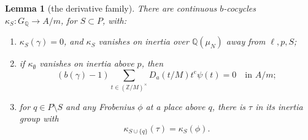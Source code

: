 \documentclass[11pt,a4paper]{article}
\newtheorem{lemma}[theorem]{Lemma}
\theoremstyle{definition}
\newcommand{\Q}{\mathbb Q}
\newcommand{\Z}{\mathbb Z}
\begin{document}
\begin{lemma}[the derivative family]\label{lem:derivative-family}
There are continuous \(b\)-cocycles
\(\kappa_S:G_\Q\to A/m\), for \(S\subset P\), with:
\begin{enumerate}[label=(\roman*)]
\item \(\kappa_S(\gamma)=0\), and \(\kappa_S\) vanishes on
inertia over \(\Q(\mu_N)\) away from \(\ell,p,S\);
\item if \(\kappa_\emptyset\) vanishes on inertia above \(p\), then
\[
 (b(\gamma)-1)
 \sum_{t\in(\Z/M)^\times}D_a(t/M)t^e\psi(t)=0
                                      \quad\text{in }A/m;
\]
\item for \(q\in P\setminus S\) and any Frobenius \(\phi\)
at a place above \(q\), there is \(\tau\) in its inertia group with
\[
 \kappa_{S\cup\{q\}}(\tau)=\kappa_S(\phi).
\]
\end{enumerate}
\end{lemma}
\end{document}
